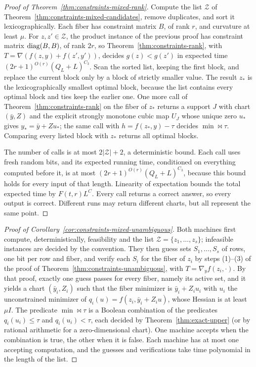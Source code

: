 \begin{proof}[Proof of Theorem~\ref{thm:constraints-mixed-rank}]
Compute the list $\mathcal Z$ of Theorem~\ref{thm:constraints-mixed-candidates},
remove duplicates, and sort it lexicographically. Each fiber has constraint
matrix $B$, of rank $r$, and curvature at least $\mu$. For $z,z'\in\mathcal Z$,
the product instance of the previous proof has constraint matrix
$\operatorname{diag}(B,B)$, of rank $2r$, so Theorem~\ref{thm:constraints-rank}, with
$T=\nabla(f(z,y)+f(z',y'))$, decides $g(z)<g(z')$ in expected time
$(2r+1)^{O(r)}(Q_L+L)^{C_3}$. Scan the sorted list, keeping the first block,
and replace the current block only by a block of strictly smaller value. The
result $z_*$ is the lexicographically smallest optimal block, because the list
contains every optimal block and ties keep the earlier one. One more call of
Theorem~\ref{thm:constraints-rank} on the fiber of $z_*$ returns a support $J$
with chart $(\bar y,Z)$ and the explicit strongly monotone cubic map $U_J$ whose
unique zero $u_*$ gives $y_*=\bar y+Zu_*$; the same call with
$h=f(z_*,y)-\tau$ decides $\min\bowtie\tau$. Comparing every listed block with
$z_*$ returns all optimal blocks.

The number of calls is at most $2|\mathcal Z|+2$, a deterministic bound.
Each call uses fresh random bits, and its expected running time, conditioned
on everything computed before it, is at most
$(2r+1)^{O(r)}(Q_L+L)^{C_3}$, because this bound holds for every input of
that length. Linearity of expectation bounds the total expected time by
$F(t,r)L^{C}$. Every call returns a correct answer, so every output is
correct. Different runs may return different charts, but all represent the
same point.
\end{proof}

\begin{proof}[Proof of Corollary~\ref{cor:constraints-mixed-unambiguous}]
Both machines first compute, deterministically, feasibility and the list
$\mathcal Z=\{z_1,\ldots,z_s\}$; infeasible instances are decided by the
convention. They then guess sets $S_1,\ldots,S_s$ of rows, one bit per row and
fiber, and verify each $S_i$ for the fiber of $z_i$ by steps (1)--(3) of the
proof of Theorem~\ref{thm:constraints-unambiguous}, with $T=\nabla_yf(z_i,\cdot)$.
By that proof, exactly one guess passes for every fiber, namely its active
set, and it yields a chart $(\bar y_i,Z_i)$ such that the fiber minimizer is
$\bar y_i+Z_iu_i$ with $u_i$ the unconstrained minimizer of
$q_i(u)=f(z_i,\bar y_i+Z_iu)$, whose Hessian is at least $\mu I$. The predicate
$\min\bowtie\tau$ is a Boolean combination of the predicates $q_i(u_i)\le\tau$
and $q_i(u_i)<\tau$, each decided by Theorem~\ref{thm:exact-upper} (or by
rational arithmetic for a zero-dimensional chart). One machine accepts when
the combination is true, the other when it is false. Each machine has at most
one accepting computation, and the guesses and verifications take time
polynomial in the length of the list.
\end{proof}

